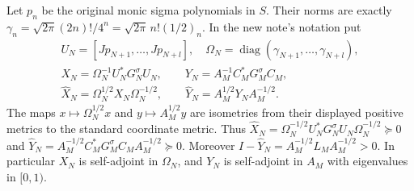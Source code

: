 \documentclass[11pt,a4paper]{article}
\newcommand{\diag}{\operatorname{diag}}
\begin{document}
Let $p_n$ be the original monic sigma polynomials in $S$.
Their norms are exactly
$\gamma_n=\sqrt{2\pi}(2n)!/4^n
=\sqrt{2\pi}\,n!(1/2)_n$.
In the new note's notation put
\[
\begin{gathered}
 U_N=[Jp_{N+1},\ldots,Jp_{N+l}],\quad
 \Omega_N=\diag(\gamma_{N+1},\ldots,\gamma_{N+l}),\\
 X_N=\Omega_N^{-1}U_N^*G_N^\sigma U_N,\qquad
 Y_N=A_M^{-1}C_M^*G_M^\sigma C_M,\\
 \widehat X_N=\Omega_N^{1/2}X_N\Omega_N^{-1/2},\qquad
 \widehat Y_N=A_M^{1/2}Y_NA_M^{-1/2}.
\end{gathered}\tag{JSR7}
\]
The maps $x\mapsto\Omega_N^{1/2}x$ and
$y\mapsto A_M^{1/2}y$ are isometries from their displayed
positive metrics to the standard coordinate metric.
Thus $\widehat X_N=\Omega_N^{-1/2}U_N^*G_N^\sigma
U_N\Omega_N^{-1/2}\succeq0$ and
$\widehat Y_N=A_M^{-1/2}C_M^*G_M^\sigma C_MA_M^{-1/2}
\succeq0$. Moreover
$I-\widehat Y_N=A_M^{-1/2}L_MA_M^{-1/2}>0$.
In particular $X_N$ is self-adjoint in $\Omega_N$, and
$Y_N$ is self-adjoint in $A_M$ with eigenvalues in $[0,1)$.
\end{document}
